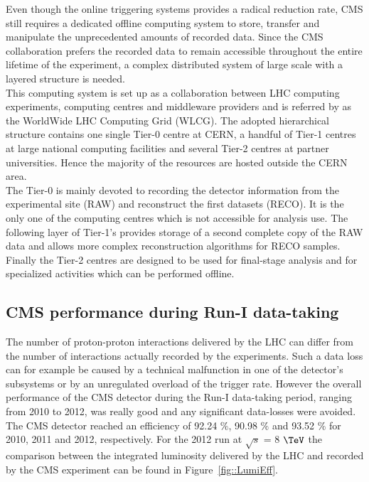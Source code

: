 Even though the online triggering systems provides a radical reduction rate, CMS still requires a dedicated offline computing system to store, transfer and manipulate the unprecedented amounts of recorded data. Since the CMS collaboration prefers the recorded data to remain accessible throughout the entire lifetime of the experiment, a complex distributed system of large scale with a layered structure is needed.
\\
This computing system is set up as a collaboration between LHC computing experiments, computing centres and middleware providers and is referred by as the WorldWide LHC Computing Grid (WLCG). The adopted hierarchical structure contains one single Tier-0 centre at CERN, a handful of Tier-1 centres at large national computing facilities and several Tier-2 centres at partner universities. Hence the majority of the resources are hosted outside the CERN area. 
\\
The Tier-0 is mainly devoted to recording the detector information from the experimental site (RAW) and reconstruct the first datasets (RECO). It is the only one of the computing centres which is not accessible for analysis use. The following layer of Tier-1's provides storage of a second complete copy of the RAW data and allows more complex reconstruction algorithms for RECO samples. Finally the Tier-2 centres are designed to be used for final-stage analysis and for specialized activities which can be performed offline.

\subsection{CMS performance during Run-I data-taking}

The number of proton-proton interactions delivered by the LHC can differ from the number of interactions actually recorded by the experiments. 
Such a data loss can for example be caused by a technical malfunction in one of the detector's subsystems or by an unregulated overload of the trigger rate. However the overall performance of the CMS detector during the Run-I data-taking period, ranging from 2010 to 2012, was really good and any significant data-losses were avoided. 
The CMS detector reached an efficiency of 92.24 $\%$, 90.98 $\%$ and 93.52 $\%$ for 2010, 2011 and 2012, respectively. For the 2012 run at $\sqrt{s}$ = 8 $\TeV$ the comparison between the integrated luminosity delivered by the LHC and recorded by the CMS experiment can be found in Figure~\ref{fig::LumiEff}.

